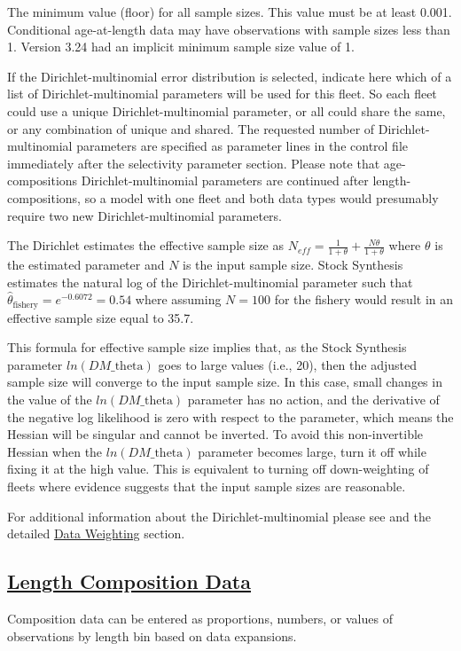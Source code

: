 The minimum value (floor) for all sample sizes. This value must be at least 0.001. Conditional age-at-length data may have observations with sample sizes less than 1. Version 3.24 had an implicit minimum sample size value of 1.

If the Dirichlet-multinomial error distribution is selected, indicate here which of a list of Dirichlet-multinomial parameters will be used for this fleet. So each fleet could use a unique Dirichlet-multinomial parameter, or all could share the same, or any combination of unique and shared. The requested number of Dirichlet-multinomial parameters are specified as parameter lines in the control file immediately after the selectivity parameter section. Please note that age-compositions Dirichlet-multinomial parameters are continued after length-compositions, so a model with one fleet and both data types would presumably require two new Dirichlet-multinomial parameters.  	 	
	
The Dirichlet estimates the effective sample size as $N_{eff}=\frac{1}{1+\theta}+\frac{N\theta}{1+\theta}$ where $\theta$ is the estimated parameter and $N$ is the input sample size. Stock Synthesis estimates the natural log of the Dirichlet-multinomial parameter such that $\hat{\theta}_{\text{fishery}} = e^{-0.6072} = 0.54$ where assuming $N=100$ for the fishery would result in an effective sample size equal to 35.7.
	
This formula for effective sample size implies that, as the Stock Synthesis parameter $ln(DM\text{\_theta})$ goes to large values (i.e., 20), then the adjusted sample size will converge to the input sample size. In this case, small changes in the value of the $ln(DM\text{\_theta})$ parameter has no action, and the derivative of the negative log likelihood is zero with respect to the parameter, which means the Hessian will be singular and cannot be inverted. To avoid this non-invertible Hessian when the $ln(DM\text{\_theta})$ parameter becomes large, turn it off while fixing it at the high value. This is equivalent to turning off down-weighting of fleets where evidence suggests that the input sample sizes are reasonable.
	
For additional information about the Dirichlet-multinomial please see \citet{thorson-model-based-2017} and the detailed \hyperlink{DataWeight}{Data Weighting} section.

\hypertarget{CompTiming}{}
\subsection[Length Composition Data]{\protect\hyperlink{CompTiming}{Length Composition Data}}
Composition data can be entered as proportions, numbers, or values of observations by length bin based on data expansions.  

